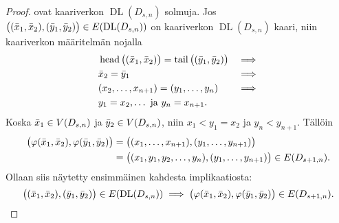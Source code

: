 \documentclass[finnish]{tktltiki2}
\theoremstyle{definition}
\theoremstyle{remark}
\DeclareMathOperator{\head}{head}
\DeclareMathOperator{\tail}{tail}
\DeclareMathOperator{\DL}{DL}
\newcommand{\Dsn}{D_{s,n}}
\newcommand{\Dssn}{D_{s+1,n}}
\begin{document}
\begin{proof}
    ovat kaariverkon $\DL(\Dsn)$ solmuja. Jos $\big((\x_1, \x_2), (\y_1, \y_2)\big) \in
    E(\DL(\Dsn))$ on kaariverkon $\DL(\Dsn)$ kaari, niin kaariverkon määritelmän nojalla
    \begin{align*}
        & \head\big((\x_1,\x_2)\big) = \tail\big((\y_1, \y_2)\big) & \implies \\
        & \x_2 = \y_1                                              & \implies \\
        & (x_2, \dots, x_{n+1}) = (y_1, \dots, y_n)                & \implies \\
        & y_1 = x_2, \dots \text{ ja } y_n = x_{n+1}.              &
    \end{align*}
    Koska $\x_1 \in V(\Dsn)$ ja $\y_2 \in V(\Dsn)$, niin
    $x_1 < y_1 = x_2$ ja $y_n < y_{n+1}$. Tällöin
    \begin{align*}
        \big(
            \varphi(\x_1, \x_2), \varphi(\y_1, \y_2)
        \big)
            &= \big(
                   (x_1, \dots, x_{n+1}), (y_1, \dots, y_{n+1})
               \big) \\
            &= \big(
                   (x_1, y_1, y_2, \dots, y_n), (y_1, \dots, y_{n+1})
               \big) \in E(\Dssn).
    \end{align*}
    Ollaan siis näytetty ensimmäinen kahdesta implikaatiosta:
    \begin{equation*}
        \big((\x_1, \x_2), (\y_1, \y_2)\big) \in E(\DL(\Dsn)) \implies
        \big(\varphi(\x_1, \x_2), \varphi(\y_1, \y_2) \big) \in E(\Dssn).
    \end{equation*}


\end{proof}
\end{document}
